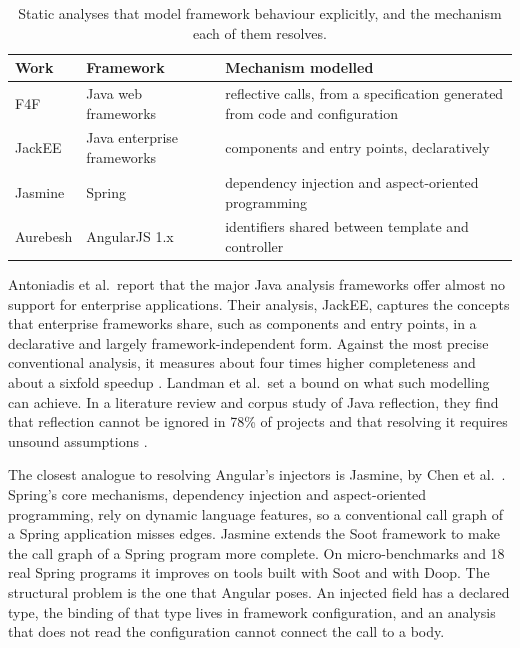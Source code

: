 \begin{table}[tbp]\small
\caption{Static analyses that model framework behaviour explicitly, and the mechanism each of
them resolves.}
\label{tab:framework-models}
\begin{tabularx}{\textwidth}{@{}lYY@{}}
\toprule
Work & Framework & Mechanism modelled \\
\midrule
F4F \cite{sridharan2011f4f} & Java web frameworks & reflective calls, from a specification generated from code and configuration \\
\addlinespace
JackEE \cite{antoniadis2020enterprise} & Java enterprise frameworks & components and entry points, declaratively \\
\addlinespace
Jasmine \cite{chen2022jasmine} & Spring & dependency injection and aspect-oriented programming \\
\addlinespace
Aurebesh \cite{ocariza2015detecting} & AngularJS 1.x & identifiers shared between template and controller \\
\bottomrule
\end{tabularx}
\end{table}

Antoniadis et al.\ report that the major Java analysis frameworks offer almost no support for
enterprise applications. Their analysis, JackEE, captures the concepts that enterprise frameworks
share, such as components and entry points, in a declarative and largely framework-independent
form. Against the most precise conventional analysis, it measures about four times higher
completeness and about a sixfold speedup \cite{antoniadis2020enterprise}. Landman et al.\ set a
bound on what such modelling can achieve. In a literature review and corpus study of Java
reflection, they find that reflection cannot be ignored in 78\% of projects and that resolving it
requires unsound assumptions \cite{landman2017challenges}.

The closest analogue to resolving Angular's injectors is Jasmine, by Chen et al.\
\cite{chen2022jasmine}. Spring's core mechanisms, dependency injection and aspect-oriented
programming, rely on dynamic language features, so a conventional call graph of a Spring
application misses edges. Jasmine extends the Soot framework to make the call graph of a Spring
program more complete. On micro-benchmarks and 18 real Spring programs it improves on tools built
with Soot and with Doop. The structural problem is the one that Angular poses. An injected field has a declared type, the
binding of that type lives in framework configuration, and an analysis that does not read the
configuration cannot connect the call to a body.

